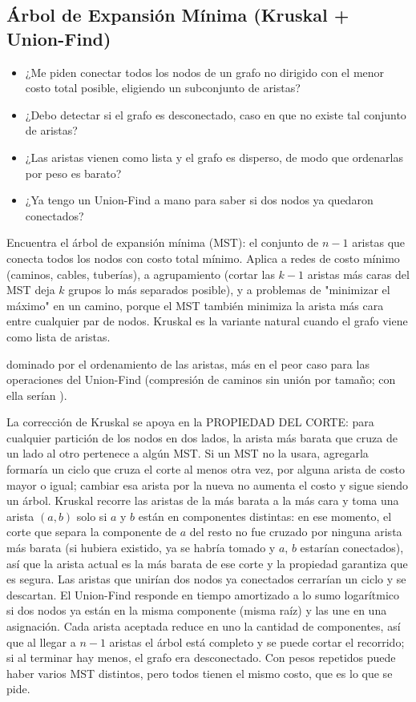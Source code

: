 \subsection{Árbol de Expansión Mínima (Kruskal + Union-Find)}
\label{alg:4-13}


\begin{itemize}
\item ¿Me piden conectar todos los nodos de un grafo no dirigido con el menor costo total posible, eligiendo un subconjunto de aristas?
\item ¿Debo detectar si el grafo es desconectado, caso en que no existe tal conjunto de aristas?
\item ¿Las aristas vienen como lista y el grafo es disperso, de modo que ordenarlas por peso es barato?
\item ¿Ya tengo un Union-Find a mano para saber si dos nodos ya quedaron conectados?
\end{itemize}

 Encuentra el árbol de expansión mínima (MST): el conjunto de $n-1$ aristas que conecta todos los nodos con costo total mínimo. Aplica a redes de costo mínimo (caminos, cables, tuberías), a agrupamiento (cortar las $k-1$ aristas más caras del MST deja $k$ grupos lo más separados posible), y a problemas de "minimizar el máximo" en un camino, porque el MST también minimiza la arista más cara entre cualquier par de nodos. Kruskal es la variante natural cuando el grafo viene como lista de aristas.

  dominado por el ordenamiento de las aristas, más  en el peor caso para las operaciones del Union-Find (compresión de caminos sin unión por tamaño; con ella serían ).

 La corrección de Kruskal se apoya en la PROPIEDAD DEL CORTE: para cualquier partición de los nodos en dos lados, la arista más barata que cruza de un lado al otro pertenece a algún MST. Si un MST no la usara, agregarla formaría un ciclo que cruza el corte al menos otra vez, por alguna arista de costo mayor o igual; cambiar esa arista por la nueva no aumenta el costo y sigue siendo un árbol. Kruskal recorre las aristas de la más barata a la más cara y toma una arista $(a, b)$ solo si $a$ y $b$ están en componentes distintas: en ese momento, el corte que separa la componente de $a$ del resto no fue cruzado por ninguna arista más barata (si hubiera existido, ya se habría tomado y $a$, $b$ estarían conectados), así que la arista actual es la más barata de ese corte y la propiedad garantiza que es segura. Las aristas que unirían dos nodos ya conectados cerrarían un ciclo y se descartan. El Union-Find responde en tiempo amortizado a lo sumo logarítmico si dos nodos ya están en la misma componente (misma raíz) y las une en una asignación. Cada arista aceptada reduce en uno la cantidad de componentes, así que al llegar a $n-1$ aristas el árbol está completo y se puede cortar el recorrido; si al terminar hay menos, el grafo era desconectado. Con pesos repetidos puede haber varios MST distintos, pero todos tienen el mismo costo, que es lo que se pide.~\cite{kruskal1956}

